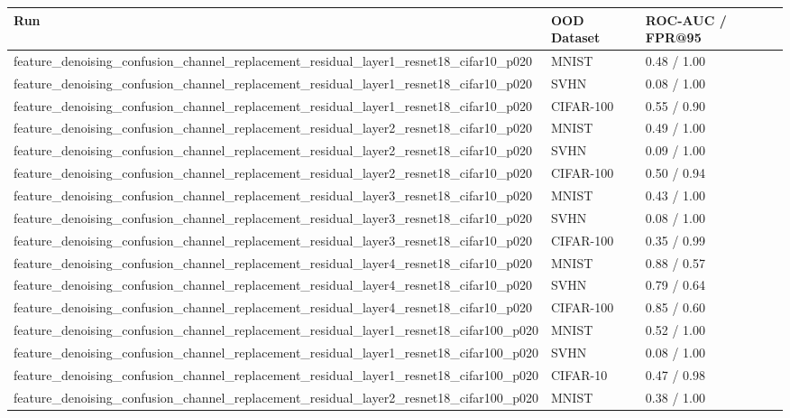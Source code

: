 \begin{tabular}{lll}
\toprule
Run & OOD Dataset & ROC-AUC / FPR@95 \\
\midrule
feature\_denoising\_confusion\_channel\_replacement\_residual\_layer1\_resnet18\_cifar10\_p020 & MNIST & 0.48 / 1.00 \\
feature\_denoising\_confusion\_channel\_replacement\_residual\_layer1\_resnet18\_cifar10\_p020 & SVHN & 0.08 / 1.00 \\
feature\_denoising\_confusion\_channel\_replacement\_residual\_layer1\_resnet18\_cifar10\_p020 & CIFAR-100 & 0.55 / 0.90 \\
feature\_denoising\_confusion\_channel\_replacement\_residual\_layer2\_resnet18\_cifar10\_p020 & MNIST & 0.49 / 1.00 \\
feature\_denoising\_confusion\_channel\_replacement\_residual\_layer2\_resnet18\_cifar10\_p020 & SVHN & 0.09 / 1.00 \\
feature\_denoising\_confusion\_channel\_replacement\_residual\_layer2\_resnet18\_cifar10\_p020 & CIFAR-100 & 0.50 / 0.94 \\
feature\_denoising\_confusion\_channel\_replacement\_residual\_layer3\_resnet18\_cifar10\_p020 & MNIST & 0.43 / 1.00 \\
feature\_denoising\_confusion\_channel\_replacement\_residual\_layer3\_resnet18\_cifar10\_p020 & SVHN & 0.08 / 1.00 \\
feature\_denoising\_confusion\_channel\_replacement\_residual\_layer3\_resnet18\_cifar10\_p020 & CIFAR-100 & 0.35 / 0.99 \\
feature\_denoising\_confusion\_channel\_replacement\_residual\_layer4\_resnet18\_cifar10\_p020 & MNIST & 0.88 / 0.57 \\
feature\_denoising\_confusion\_channel\_replacement\_residual\_layer4\_resnet18\_cifar10\_p020 & SVHN & 0.79 / 0.64 \\
feature\_denoising\_confusion\_channel\_replacement\_residual\_layer4\_resnet18\_cifar10\_p020 & CIFAR-100 & 0.85 / 0.60 \\
feature\_denoising\_confusion\_channel\_replacement\_residual\_layer1\_resnet18\_cifar100\_p020 & MNIST & 0.52 / 1.00 \\
feature\_denoising\_confusion\_channel\_replacement\_residual\_layer1\_resnet18\_cifar100\_p020 & SVHN & 0.08 / 1.00 \\
feature\_denoising\_confusion\_channel\_replacement\_residual\_layer1\_resnet18\_cifar100\_p020 & CIFAR-10 & 0.47 / 0.98 \\
feature\_denoising\_confusion\_channel\_replacement\_residual\_layer2\_resnet18\_cifar100\_p020 & MNIST & 0.38 / 1.00 \\

\end{tabular}
